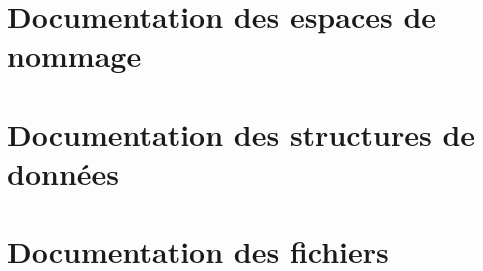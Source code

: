 \documentclass[twoside]{book}
\newcommand{\+}{\discretionary{\mbox{\scriptsize$\hookleftarrow$}}{}{}}
\newcommand{\clearemptydoublepage}{%
  \newpage{\pagestyle{empty}\cleardoublepage}%
}
\begin{document}
\chapter{Documentation des espaces de nommage}


\chapter{Documentation des structures de données}


















\chapter{Documentation des fichiers}







































\backmatter
\newpage
{}
\clearemptydoublepage
{}
\printindex
\end{document}
